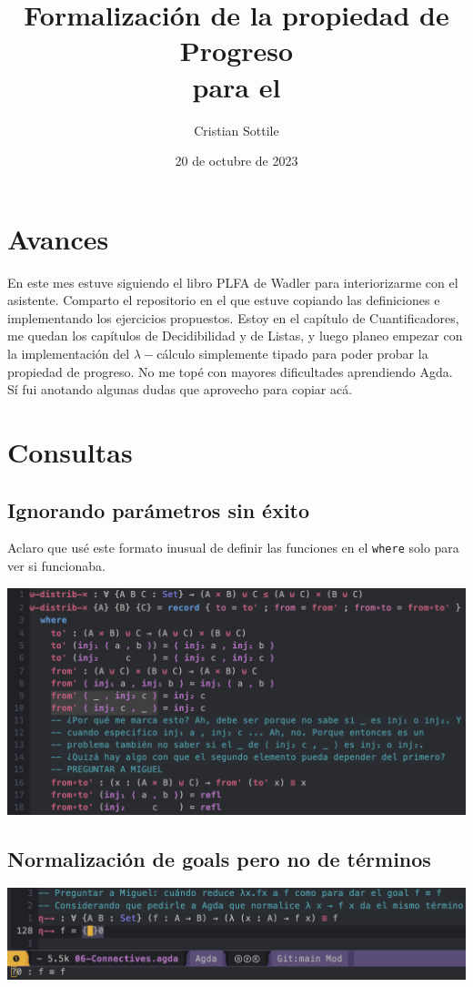 \documentclass{article}
\title{Formalización de la propiedad de Progreso\\para el \stlcw}
\author{Cristian Sottile}
\date{20 de octubre de 2023}
\newcommand{\stlcw}{$\lambda-$cálculo simplemente tipado\xspace}
\begin{document}
\maketitle


\section{Avances}

En este mes estuve siguiendo el libro PLFA de Wadler para interiorizarme con el
asistente. Comparto el repositorio en el que estuve copiando las definiciones e
implementando los ejercicios propuestos. Estoy en el capítulo de
Cuantificadores, me quedan los capítulos de Decidibilidad y de Listas, y luego
planeo empezar con la implementación del $\lambda-$cálculo simplemente tipado
para poder probar la propiedad de progreso. No me topé con mayores dificultades
aprendiendo Agda. Sí fui anotando algunas dudas que aprovecho para copiar acá.

\section{Consultas}

\subsection{Ignorando parámetros sin éxito}

Aclaro que usé este formato inusual de definir las funciones en el
\texttt{where} solo para ver si funcionaba.

\includegraphics[width=\textwidth]{consulta2.png}

\subsection{Normalización de goals pero no de términos}

\includegraphics[width=\textwidth]{consulta1.png}
\end{document}
